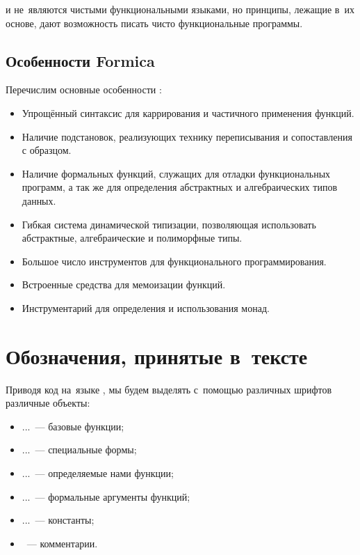  и  не~являются чистыми функциональными языками, но принципы, лежащие в~их основе, дают возможность писать чисто функциональные программы. 

\subsection{Особенности Formica}%
Перечислим основные особенности \FLP:

\begin{itemize}
  \item Упрощённый синтаксис для каррирования и частичного применения функций.
  \item Наличие подстановок, реализующих технику переписывания и сопоставления с образцом.
  \item Наличие формальных функций, служащих для отладки функциональных программ, а так же для определения абстрактных и алгебраических типов данных.
  \item Гибкая система динамической типизации, позволяющая использовать абстрактные, алгебраические и полиморфные \mbox{типы}.
  \item Большое число инструментов для функционального программирования.
  \item Встроенные средства для мемоизации функций.
  \item Инструментарий для определения и использования монад.
\end{itemize}

\section{Обозначения, принятые в~тексте}%
Приводя код на~языке \Scheme, мы будем выделять с~помощью различных шрифтов различные объекты:

\begin{itemize}[\ ]
  \item {} ...~--- базовые функции; 
  \item {} ...~--- специальные формы;
  \item {} ...~--- определяемые нами функции;
  \item {} ...~--- формальные аргументы функций;
  \item {} ...~--- константы;
  \item {}~--- комментарии.
\end{itemize}

\newpage
